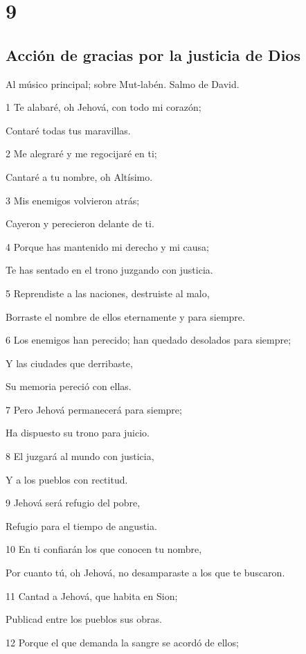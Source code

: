 \chapter{9}

\section*{Acción de gracias por la justicia de Dios}

\par Al músico principal; sobre Mut-labén. Salmo de David.

\par 1 Te alabaré, oh Jehová, con todo mi corazón;
\par Contaré todas tus maravillas.
\par 2 Me alegraré y me regocijaré en ti;
\par Cantaré a tu nombre, oh Altísimo.
\par 3 Mis enemigos volvieron atrás;
\par Cayeron y perecieron delante de ti.
\par 4 Porque has mantenido mi derecho y mi causa;
\par Te has sentado en el trono juzgando con justicia.
\par 5 Reprendiste a las naciones, destruiste al malo,
\par Borraste el nombre de ellos eternamente y para siempre.
\par 6 Los enemigos han perecido; han quedado desolados para siempre;
\par Y las ciudades que derribaste,
\par Su memoria pereció con ellas.
\par 7 Pero Jehová permanecerá para siempre;
\par Ha dispuesto su trono para juicio.
\par 8 El juzgará al mundo con justicia,
\par Y a los pueblos con rectitud.
\par 9 Jehová será refugio del pobre,
\par Refugio para el tiempo de angustia.
\par 10 En ti confiarán los que conocen tu nombre,
\par Por cuanto tú, oh Jehová, no desamparaste a los que te buscaron.
\par 11 Cantad a Jehová, que habita en Sion;
\par Publicad entre los pueblos sus obras.
\par 12 Porque el que demanda la sangre se acordó de ellos;
